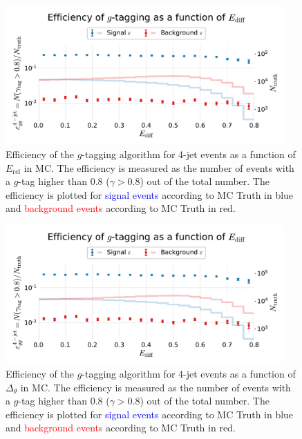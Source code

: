 \begin{figure}
  \centerfloat
  \includegraphics[width=0.95\textwidth, trim=10 10 10 50, clip, page=3]{figures/quarks/efficiency_events-down_sample=1.00-ML_vars=vertex-selection=b-ejet_min=4-n_iter_RS_lgb=99-n_iter_RS_xgb=9-cdot_cut=0.90-version=19-njet=4.pdf}
  \caption[$g$-Tagging Efficiency for 4-Jet Events in MC as a Function of $E_\mathrm{rel}$]
          {Efficiency of the $g$-tagging algorithm for 4-jet events as a function of $E_\mathrm{rel}$  in MC. The efficiency is measured as the number of events with a $g$-tag higher than 0.8 ($\gamma > 0.8$) out of the total number. The efficiency is plotted for \textcolor{blue}{signal events} according to MC Truth in blue and \textcolor{red}{background events} according to MC Truth in red.
          } 
  \label{fig:q:effiency_gtag_E_rel}
\end{figure}
\begin{figure}
  \centerfloat
  \includegraphics[width=0.95\textwidth, trim=10 10 10 50, clip, page=4]{figures/quarks/efficiency_events-down_sample=1.00-ML_vars=vertex-selection=b-ejet_min=4-n_iter_RS_lgb=99-n_iter_RS_xgb=9-cdot_cut=0.90-version=19-njet=4.pdf}
  \caption[$g$-Tagging Efficiency for 4-Jet Events in MC as a Function of $\Delta_\theta$]
          {Efficiency of the $g$-tagging algorithm for 4-jet events as a function of $\Delta_\theta$  in MC. The efficiency is measured as the number of events with a $g$-tag higher than 0.8 ($\gamma > 0.8$) out of the total number. The efficiency is plotted for \textcolor{blue}{signal events} according to MC Truth in blue and \textcolor{red}{background events} according to MC Truth in red.
          } 
  \label{fig:q:effiency_gtag_delta_theta}
\end{figure}
